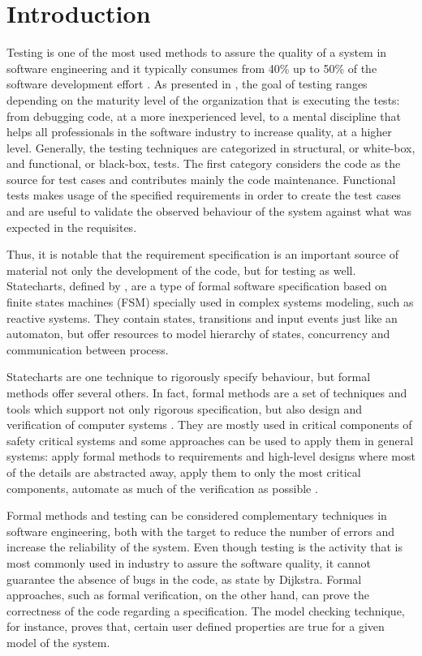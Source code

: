 \chapter{Introduction}
\label{cap:introducao}

Testing is one of the most used methods to assure the quality of a system in software engineering and it typically consumes from 40\% up to 50\% of the software development effort \cite{Luo}. As presented in \cite{Ammann:08}, the goal of testing ranges depending on the maturity level of the organization that is executing the tests: from debugging code, at a more inexperienced level, to a mental discipline that helps all professionals in the software industry to increase quality, at a higher level. Generally, the testing techniques are categorized in structural, or white-box, and functional, or black-box, tests. The first category considers the code as the source for test cases and contributes mainly the code maintenance. Functional tests makes usage of the specified requirements in order to create the test cases and are useful to validate the observed behaviour of the system against what was expected in the requisites.

Thus, it is notable that the requirement specification is an important source of material not only the development of the code, but for testing as well. Statecharts, defined by \cite{harel87:semantics_statecharts}, are a type of formal software specification based on finite states machines (FSM) specially used in complex systems modeling, such as reactive systems. They contain states, transitions and input events just like an automaton, but offer resources to model hierarchy of states, concurrency and communication between process.

Statecharts are one technique to rigorously specify behaviour, but formal methods offer several others. In fact, formal methods are a set of techniques and tools which support not only rigorous specification, but also design and verification of computer systems \cite{FMEurope}. They are mostly used in critical components of safety critical systems and some approaches can be used to apply them in general systems: apply formal methods to requirements and high-level designs where most of the details are abstracted away, apply them to only the most critical components, automate as much of the verification as possible \cite{NASAlangley}. 


Formal methods and testing can be considered complementary techniques in software engineering, both with the target to reduce the number of errors and increase the reliability of the system\cite{fortest}. Even though testing is the activity that is most commonly used in industry to assure the software quality, it cannot guarantee the absence of bugs in the code, as state by Dijkstra. Formal approaches, such as formal verification, on the other hand, can prove the correctness of the code regarding a specification. The model checking technique, for instance, proves that, certain user defined properties are true for a given model of the system.


